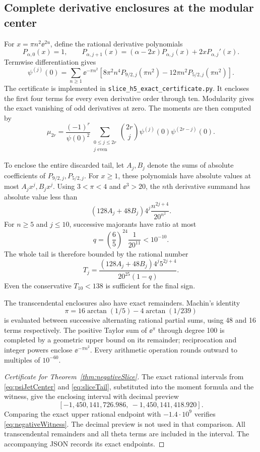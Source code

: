 \subsection{Complete derivative enclosures at the modular center}
For $x=\pi n^2\ee^{2u}$, define the rational derivative polynomials
\[
P_{\alpha,0}(x)=1,\qquad
P_{\alpha,j+1}(x)=(\alpha-2x)P_{\alpha,j}(x)+2xP_{\alpha,j}'(x).
\]
Termwise differentiation gives
\begin{equation}\label{eq:psiJetCenter}
\psi^{(j)}(0)=\sum_{n\ge1}\ee^{-\pi n^2}
\left[8\pi^2n^4P_{9/2,j}(\pi n^2)-12\pi n^2P_{5/2,j}(\pi n^2)\right].
\end{equation}
The certificate is implemented in \texttt{slice\_h5\_exact\_certificate.py}. It encloses the first four terms for every even derivative order through ten. Modularity gives the exact vanishing of odd derivatives at zero. The moments are then computed by
\[
\mu_{2r}=\frac{(-1)^r}{\psi(0)^2}
\sum_{\substack{0\le j\le2r\\j\text{ even}}}
\binom{2r}{j}\psi^{(j)}(0)\psi^{(2r-j)}(0).
\]

To enclose the entire discarded tail, let $A_j,B_j$ denote the sums of absolute coefficients of $P_{9/2,j},P_{5/2,j}$. For $x\ge1$, these polynomials have absolute values at most $A_jx^j,B_jx^j$. Using $3<\pi<4$ and $\ee^3>20$, the $n$th derivative summand has absolute value less than
\[
(128A_j+48B_j)4^j\frac{n^{2j+4}}{20^{n^2}}.
\]
For $n\ge5$ and $j\le10$, successive majorants have ratio at most
\[
q=\left(\frac65\right)^{24}\frac1{20^{11}}<10^{-10}.
\]
The whole tail is therefore bounded by the rational number
\begin{equation}\label{eq:sliceTail}
T_j=\frac{(128A_j+48B_j)4^j5^{2j+4}}{20^{25}(1-q)}.
\end{equation}
Even the conservative $T_{10}<138$ is sufficient for the final sign.

The transcendental enclosures also have exact remainders. Machin's identity
\[
\pi=16\arctan(1/5)-4\arctan(1/239)
\]
is evaluated between successive alternating rational partial sums, using 48 and 16 terms respectively. The positive Taylor sum of $\ee^\pi$ through degree 100 is completed by a geometric upper bound on its remainder; reciprocation and integer powers enclose $\ee^{-\pi n^2}$. Every arithmetic operation rounds outward to multiples of $10^{-60}$.

\begin{proof}[Certificate for Theorem~\ref{thm:negativeSlice}]
The exact rational intervals from \eqref{eq:psiJetCenter} and \eqref{eq:sliceTail}, substituted into the moment formula and the witness, give the enclosing interval with decimal preview
\[
[-1{,}450{,}141{,}726.986,\ -1{,}450{,}141{,}418.920].
\]
Comparing the exact upper rational endpoint with $-1.4\cdot10^9$ verifies \eqref{eq:negativeWitness}. The decimal preview is not used in that comparison. All transcendental remainders and all theta terms are included in the interval. The accompanying JSON records its exact endpoints.
\end{proof}

